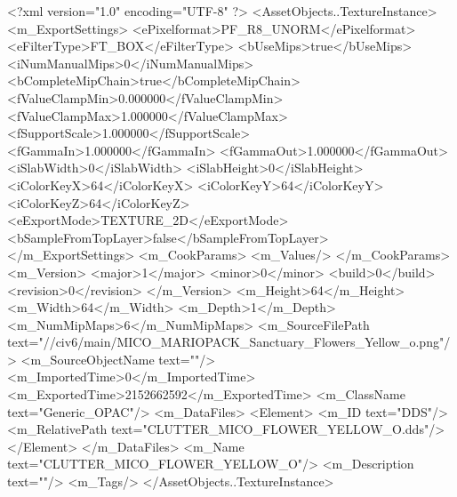 <?xml version="1.0" encoding="UTF-8" ?>
<AssetObjects..TextureInstance>
	<m_ExportSettings>
		<ePixelformat>PF_R8_UNORM</ePixelformat>
		<eFilterType>FT_BOX</eFilterType>
		<bUseMips>true</bUseMips>
		<iNumManualMips>0</iNumManualMips>
		<bCompleteMipChain>true</bCompleteMipChain>
		<fValueClampMin>0.000000</fValueClampMin>
		<fValueClampMax>1.000000</fValueClampMax>
		<fSupportScale>1.000000</fSupportScale>
		<fGammaIn>1.000000</fGammaIn>
		<fGammaOut>1.000000</fGammaOut>
		<iSlabWidth>0</iSlabWidth>
		<iSlabHeight>0</iSlabHeight>
		<iColorKeyX>64</iColorKeyX>
		<iColorKeyY>64</iColorKeyY>
		<iColorKeyZ>64</iColorKeyZ>
		<eExportMode>TEXTURE_2D</eExportMode>
		<bSampleFromTopLayer>false</bSampleFromTopLayer>
	</m_ExportSettings>
	<m_CookParams>
		<m_Values/>
	</m_CookParams>
	<m_Version>
		<major>1</major>
		<minor>0</minor>
		<build>0</build>
		<revision>0</revision>
	</m_Version>
	<m_Height>64</m_Height>
	<m_Width>64</m_Width>
	<m_Depth>1</m_Depth>
	<m_NumMipMaps>6</m_NumMipMaps>
	<m_SourceFilePath text="//civ6/main/MICO_MARIOPACK\Textures\Flower_Sanctuary_Flowers_Yellow_o.png"/>
	<m_SourceObjectName text=""/>
	<m_ImportedTime>0</m_ImportedTime>
	<m_ExportedTime>2152662592</m_ExportedTime>
	<m_ClassName text="Generic_OPAC"/>
	<m_DataFiles>
		<Element>
			<m_ID text="DDS"/>
			<m_RelativePath text="CLUTTER_MICO_FLOWER_YELLOW_O.dds"/>
		</Element>
	</m_DataFiles>
	<m_Name text="CLUTTER_MICO_FLOWER_YELLOW_O"/>
	<m_Description text=""/>
	<m_Tags/>
</AssetObjects..TextureInstance>

